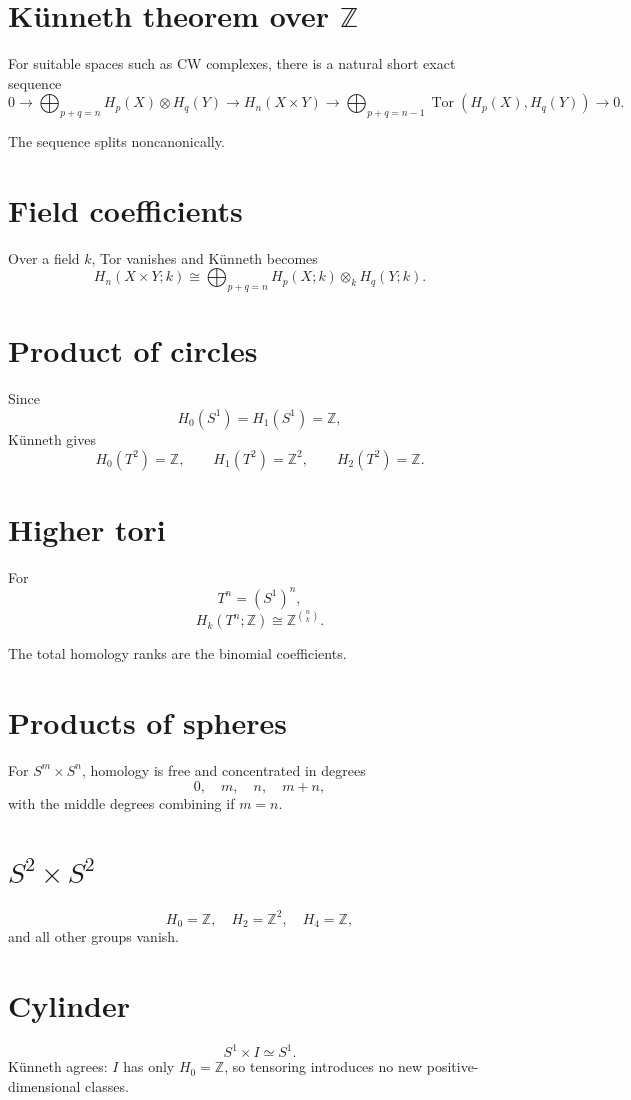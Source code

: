 \section{Künneth theorem over \(\mathbb Z\)}
\begin{theorem}
\label{thm:viii27-kunneth}
For suitable spaces such as CW complexes, there is a natural short exact
sequence
\[
0\to
\bigoplus_{p+q=n}
H_p(X)\otimes H_q(Y)
\longrightarrow
H_n(X\times Y)
\longrightarrow
\bigoplus_{p+q=n-1}
\operatorname{Tor}(H_p(X),H_q(Y))
\to0.
\]
\end{theorem}

The sequence splits noncanonically.

\section{Field coefficients}
Over a field \(k\), Tor vanishes and Künneth becomes
\[
H_n(X\times Y;k)
\cong
\bigoplus_{p+q=n}
H_p(X;k)\otimes_k H_q(Y;k).
\]

\section{Product of circles}
Since
\[
H_0(S^1)=H_1(S^1)=\mathbb Z,
\]
Künneth gives
\[
H_0(T^2)=\mathbb Z,
\qquad
H_1(T^2)=\mathbb Z^2,
\qquad
H_2(T^2)=\mathbb Z.
\]

\section{Higher tori}
For
\[
T^n=(S^1)^n,
\]
\[
H_k(T^n;\mathbb Z)\cong\mathbb Z^{\binom nk}.
\]

The total homology ranks are the binomial coefficients.

\section{Products of spheres}
For \(S^m\times S^n\), homology is free and concentrated in degrees
\[
0,\quad m,\quad n,\quad m+n,
\]
with the middle degrees combining if \(m=n\).

\section{\(S^2\times S^2\)}
\[
H_0=\mathbb Z,\quad
H_2=\mathbb Z^2,\quad
H_4=\mathbb Z,
\]
and all other groups vanish.

\section{Cylinder}
\[
S^1\times I\simeq S^1.
\]
Künneth agrees: \(I\) has only \(H_0=\mathbb Z\), so tensoring introduces no
new positive-dimensional classes.

